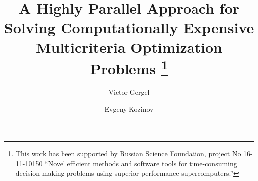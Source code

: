 %
%
%
%
%
%
\RequirePackage{fix-cm}
%
\documentclass[runningheads]{llncs}
%
%
\usepackage{graphicx}
\usepackage{mathtools,amssymb}
%
%
%
%
%


\title{A Highly Parallel Approach for Solving Computationally Expensive Multicriteria Optimization Problems
\thanks{This work has been supported by Russian Science Foundation, project No 16-11-10150 ``Novel efficient methods and software tools for time-consuming decision making problems using superior-performance supercomputers.''}
}


\author{Victor Gergel \and Evgeny Kozinov }





